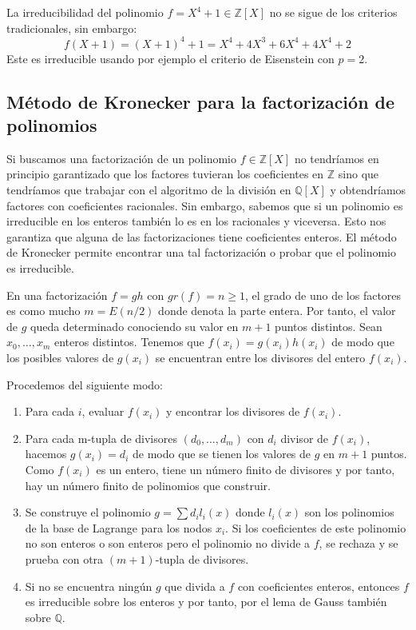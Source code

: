 \begin{example}
La irreducibilidad del polinomio $f = X^4+1 \in \mathbb{Z}[X]$ no se sigue de los criterios tradicionales, sin embargo: $$f(X+1) = (X+1)^4 + 1 = X^4 + 4X^3 + 6X^4 + 4X^4 + 2$$ Este es irreducible usando por ejemplo el criterio de Eisenstein con $p = 2$. 
\end{example}

\subsection{Método de Kronecker para la factorización de polinomios}

Si buscamos una factorización de un polinomio $f \in \mathbb{Z}[X]$ no tendríamos en principio garantizado que los factores tuvieran los coeficientes en $\mathbb{Z}$ sino que tendríamos que trabajar con el algoritmo de la división en $\mathbb{Q}[X]$ y obtendríamos factores con coeficientes racionales. Sin embargo, sabemos que si un polinomio es irreducible en los enteros también lo es en los racionales y viceversa. Esto nos garantiza que alguna de las factorizaciones tiene coeficientes enteros. El método de Kronecker permite encontrar una tal factorización o probar que el polinomio es irreducible. 

En una factorización $f = gh$ con $gr(f) = n \ge 1$, el grado de uno de los factores es como mucho $m = E(n/2)$ donde denota la parte entera. Por tanto, el valor de $g$ queda determinado conociendo su valor en $m+1$ puntos distintos. Sean $x_0,\ldots,x_m$ enteros distintos. Tenemos que $f(x_i) = g(x_i)h(x_i)$ de modo que los posibles valores de $g(x_i)$ se encuentran entre los divisores del entero $f(x_i)$.

Procedemos del siguiente modo:

\begin{enumerate}
\item Para cada $i$, evaluar $f(x_i)$ y encontrar los divisores de $f(x_i)$.

\item Para cada m-tupla de divisores $(d_0,\ldots,d_{m})$ con $d_i$ divisor de $f(x_i)$, hacemos $g(x_i) = d_i$ de modo que se tienen los valores de $g$ en $m+1$ puntos. Como $f(x_i)$ es un entero, tiene un número finito de divisores y por tanto, hay un número finito de polinomios que construir. 

\item Se construye el polinomio $g = \sum d_i l_i(x)$ donde $l_i(x)$ son los polinomios de la base de Lagrange para los nodos $x_i$. Si los coeficientes de este polinomio no son enteros o son enteros pero el polinomio no divide a $f$, se rechaza y se prueba con otra $(m+1)$-tupla de divisores. 

\item Si no se encuentra ningún $g$ que divida a $f$ con coeficientes enteros, entonces $f$ es irreducible sobre los enteros y por tanto, por el lema de Gauss también sobre $\mathbb{Q}$.
\end{enumerate} 

